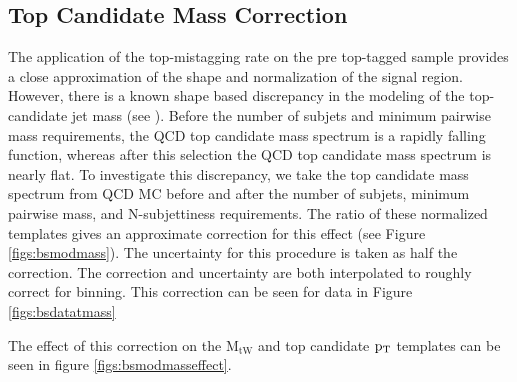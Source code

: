 \subsection{Top Candidate Mass Correction}
\label{sec:bsmodmass}
The application of the top-mistagging rate on the pre top-tagged sample provides a close approximation of the shape and normalization of the signal region.  
However, there is a known shape based discrepancy in the modeling of the top-candidate jet mass (see \cite{7tevZprime}). 
Before the number of subjets and minimum pairwise mass requirements, the QCD top candidate mass spectrum is a rapidly falling function, whereas after 
this selection the QCD top candidate mass spectrum is nearly flat.  To investigate this discrepancy, we take the top candidate mass 
spectrum from QCD MC before and after the number of subjets, minimum pairwise mass, and N-subjettiness requirements.  
The ratio of these normalized templates gives an approximate correction for this effect (see Figure \ref{figs:bsmodmass}).  The uncertainty for this procedure is taken as half the correction.  
The correction and uncertainty are both interpolated to roughly correct for binning.  This correction can be seen for data in Figure \ref{figs:bsdatatmass}

The effect of this correction on the $\mathrm{M_{tW}}$ and top candidate $\mathrm{p_{T}}$ templates can be seen in figure \ref{figs:bsmodmasseffect}.

